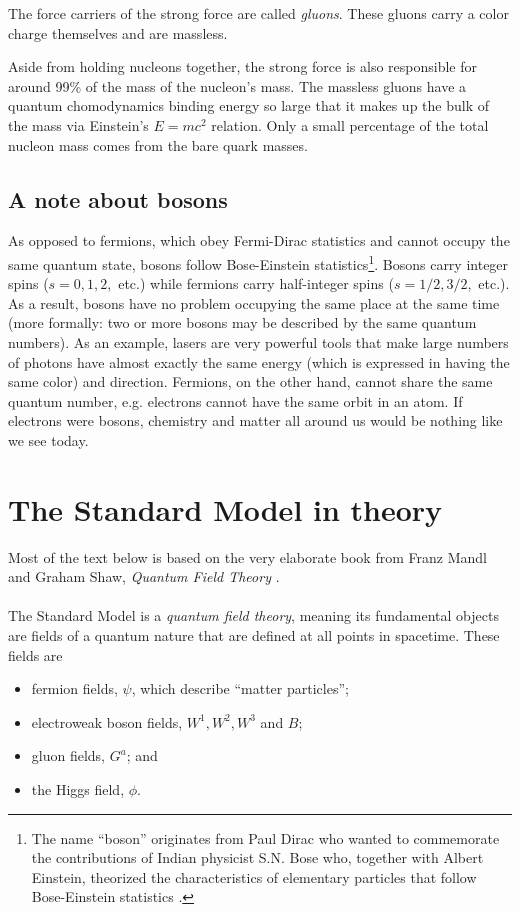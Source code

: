 The force carriers of the strong force are called \textit{gluons}. These gluons carry a color charge themselves and are massless.

Aside from holding nucleons together, the strong force is also responsible for around 99\% of the mass of the nucleon's mass. The massless gluons have a quantum chomodynamics binding energy so large that it makes up the bulk of the mass via Einstein's $E=mc^2$ relation. Only a small percentage of the total nucleon mass comes from the bare quark masses.

\subsection{A note about bosons}
As opposed to fermions, which obey Fermi-Dirac statistics and cannot occupy the same quantum state, bosons follow Bose-Einstein statistics\footnote{The name ``boson'' originates from Paul Dirac who wanted to commemorate the contributions of Indian physicist S.N. Bose who, together with Albert Einstein, theorized the characteristics of elementary particles that follow Bose-Einstein statistics \cite{farmelo2009strangest}.}. Bosons carry integer spins ($s=0,1,2,$ etc.) while fermions carry half-integer spins ($s=1/2,3/2,$ etc.). As a result, bosons have no problem occupying the same place at the same time (more formally: two or more bosons may be described by the same quantum numbers). As an example, lasers are very powerful tools that make large numbers of photons have almost exactly the same energy (which is expressed in having the same color) and direction. Fermions, on the other hand, cannot share the same quantum number, e.g. electrons cannot have the same orbit in an atom. If electrons were bosons, chemistry and matter all around us would be nothing like we see today.

\section{The Standard Model in theory}
\label{sec:sm}
Most of the text below is based on the very elaborate book from Franz Mandl and Graham Shaw, \textit{Quantum Field Theory} \cite{mandl2013quantum}.\\
\\
The Standard Model is a \textit{quantum field theory}, meaning its fundamental objects are fields of a quantum nature that are defined at all points in spacetime. These fields are
\begin{itemize}
\item fermion fields, $\psi$, which describe ``matter particles'';
\item electroweak boson fields, $W^1, W^2, W^3$ and $B$;
\item gluon fields, $G^a$; and
\item the Higgs field, $\phi$.
\end{itemize}

